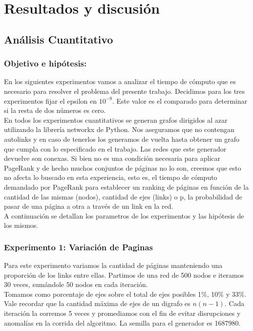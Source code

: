 \section{Resultados y discusión}

\subsection{Análisis Cuantitativo}

\subsubsection{Objetivo e hipótesis:}

En los siguientes experimentos vamos a analizar el tiempo de cómputo que es necesario para resolver el problema del presente trabajo. Decidimos para los tres experimentos fijar el epsilon en $10^{-9}$. Este valor es el comparado para determinar si la resta de dos números es cero. \\

En todos los experimentos cuantitativos se generan grafos dirigidos al azar utilizando la librería networkx \cite{networkx} de Python. Nos aseguramos que no contengan autolinks y en caso de tenerlos los generamos de vuelta hasta  obtener un grafo que cumpla con lo especificado en el trabajo. Las redes que este generador devuelve son conexas. 
Si bien no es una condición necesaria para aplicar PageRank y de hecho muchos conjuntos de páginas no lo son, creemos que esto no afecta lo buscado en esta experiencia, esto es, el tiempo de cómputo demandado por PageRank para establecer un ranking de páginas en función de la cantidad de las mismas (nodos), cantidad de ejes (links) o p, la probabilidad de pasar de una página a otra a través de un link en la red.\\

A continuación se detallan los parametros de los experimentos y las hipótesis de los mismos. \\

\subsubsection{Experimento 1: Variación de Paginas}
Para este experimento variamos la cantidad de páginas manteniendo una proporción de los links entre ellas. 
Partimos de una red de 500 nodos e iteramos 30 veces, sumándole 50 nodos en cada iteración. \\
Tomamos como porcentaje de ejes sobre el total de ejes posibles 1$\%$, 10$\%$ y 33$\%$. Vale recordar que la cantidad máxima de ejes de un digrafo es $n(n-1)$. Cada iteración la corremos 5 veces y promediamos con el fin de evitar disrupciones y anomalías en la corrida del algoritmo. La semilla para el generador es 1687980. \\
 
